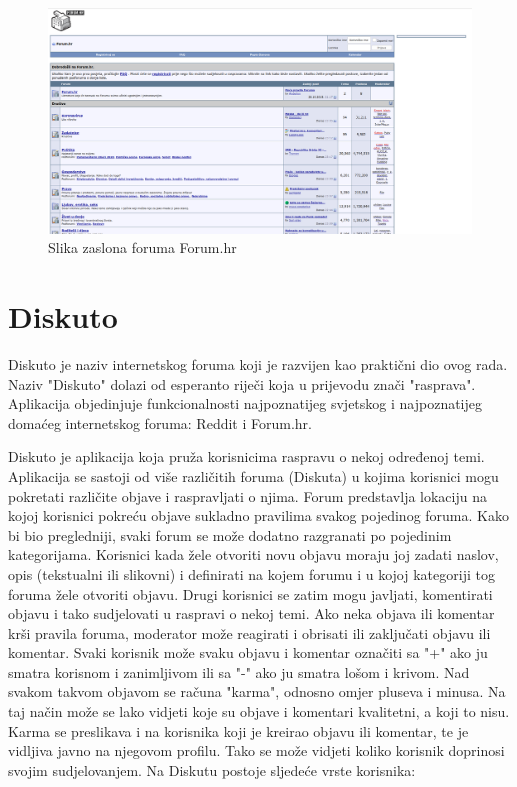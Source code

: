 \documentclass{foi}
\begin{document}
\begin{figure}[h!]
    \centering
    \includegraphics[width=1\textwidth]{slike/forumhr.png}
    \caption{Slika zaslona foruma Forum.hr}
\end{figure}

\section{Diskuto}

Diskuto je naziv internetskog foruma koji je razvijen kao praktični dio ovog rada. Naziv "Diskuto" dolazi od esperanto riječi koja u prijevodu znači "rasprava". Aplikacija objedinjuje funkcionalnosti najpoznatijeg svjetskog i najpoznatijeg domaćeg internetskog foruma: Reddit i Forum.hr.

Diskuto je aplikacija koja pruža korisnicima raspravu o nekoj određenoj temi. Aplikacija se sastoji od više različitih foruma (Diskuta) u kojima korisnici mogu pokretati različite objave i raspravljati o njima. Forum predstavlja lokaciju na kojoj korisnici pokreću objave sukladno pravilima svakog pojedinog foruma. Kako bi bio pregledniji, svaki forum se može dodatno razgranati po pojedinim kategorijama. Korisnici kada žele otvoriti novu objavu moraju joj zadati naslov, opis (tekstualni ili slikovni) i definirati na kojem forumu i u kojoj kategoriji tog foruma žele otvoriti objavu. Drugi korisnici se zatim mogu javljati, komentirati objavu i tako sudjelovati u raspravi o nekoj temi. Ako neka objava ili komentar krši pravila foruma, moderator može reagirati i obrisati ili zaključati objavu ili komentar. Svaki korisnik može svaku objavu i komentar označiti sa "+" ako ju smatra korisnom i zanimljivom ili sa "-" ako ju smatra lošom i krivom. Nad svakom takvom objavom se računa "karma", odnosno omjer pluseva i minusa. Na taj način može se lako vidjeti koje su objave i komentari kvalitetni, a koji to nisu. Karma se preslikava i na korisnika koji je kreirao objavu ili komentar, te je vidljiva javno na njegovom profilu. Tako se može vidjeti koliko korisnik doprinosi svojim sudjelovanjem. Na Diskutu postoje sljedeće vrste korisnika:
\end{document}
